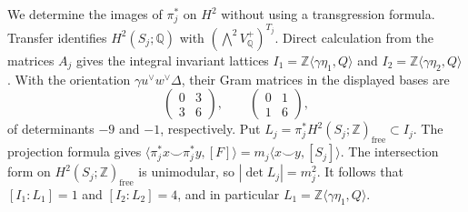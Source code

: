 We determine the images of $\pi_j^*$ on $H^2$ without using a
transgression formula.  Transfer identifies $H^2(S_j;\mathbb Q)$ with
$(\bigwedge^2V^+_{\mathbb Q})^{T_j}$.  Direct calculation from the matrices
$A_j$ gives the integral invariant lattices
$I_1=\mathbb Z\langle \gamma\eta_1,Q\rangle$ and
$I_2=\mathbb Z\langle \gamma\eta_2,Q\rangle$.
With the orientation
$\gamma u^\vee w^\vee\Delta$, their Gram matrices in the displayed bases
are
\[
 \begin{pmatrix}0&3\\3&6\end{pmatrix},
 \qquad
 \begin{pmatrix}0&1\\1&6\end{pmatrix},
\]
of determinants $-9$ and $-1$, respectively.  Put
$L_j=\pi_j^*H^2(S_j;\mathbb Z)_{\mathrm{free}}\subset I_j$.
The projection formula gives
$\langle\pi_j^*x\smile\pi_j^*y,[F]\rangle
=m_j\langle x\smile y,[S_j]\rangle$.
The intersection form on $H^2(S_j;\mathbb Z)_{\mathrm{free}}$ is
unimodular, so $|\det L_j|=m_j^2$.  It follows that
$[I_1:L_1]=1$ and $[I_2:L_2]=4$, and in particular
$L_1=\mathbb Z\langle \gamma\eta_1,Q\rangle$.

